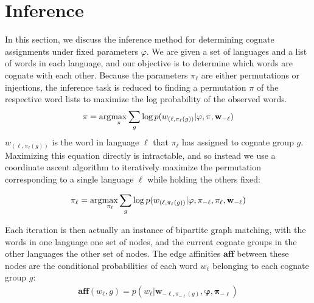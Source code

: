 \documentclass[11pt,a4paper]{article}
\begin{document}
\section{Inference}
In this section, we discuss the inference method for determining
cognate assignments under fixed parameters $\varphi$.  We are given a
set of languages and a list of words in each language, and our
objective is to determine which words are cognate with each other.
Because the parameters $\pi_\ell$ are either permutations or injections,
the inference task is reduced to finding a permutation $\pi$ of the
respective word lists to maximize the log probability of the observed
words.
\begin{equation*}
  \begin{split}
    \mathbf{\pi} = \arg\negthinspace\max_{\mathbf \pi} \sum_{g} \log p(w_{(\ell,\pi_\ell(g))}|\mathbf \varphi,\mathbf \pi, \mathbf{w}_{-\ell})
   \end{split}
 \end{equation*}
$w_{(\ell,\pi_\ell(g))}$ is the word in language $\ell$ that
$\pi_\ell$ has assigned to cognate group $g$. Maximizing this equation
directly is intractable, and so instead we use a coordinate ascent
algorithm to iteratively maximize the permutation corresponding to
a single language $\ell$ while holding the others fixed:
\resizebox{3in}{!} {
\begin{minipage}[b]{0.5\textwidth}
\begin{equation*}
  \begin{split}
    \pi_\ell = \arg\negthinspace\max_{\pi_\ell} \sum_{g} \log p(w_{(\ell,\pi_\ell(g))}|\mathbf \varphi,\mathbf \pi_{-\ell},\pi_\ell, \mathbf{w}_{-\ell})
  \end{split}
\end{equation*}
\end{minipage}
}
Each iteration is then actually an instance of bipartite graph
matching, with the words in one language one set of nodes, and the
current cognate groups in the other languages the other set of
nodes. The edge affinities $\mathbf{aff}$ between these nodes are
the conditional probabilities of each word $w_\ell$ belonging to
each cognate group $g$:
\begin{equation*}
  \begin{split}
    \mathbf{aff}(w_\ell,g) = p(w_\ell|\mathbf w_{-\ell,\pi_{-\ell}(g)},\mathbf \varphi,\mathbf\pi_{-\ell})
   \end{split}
 \end{equation*}
\end{document}
